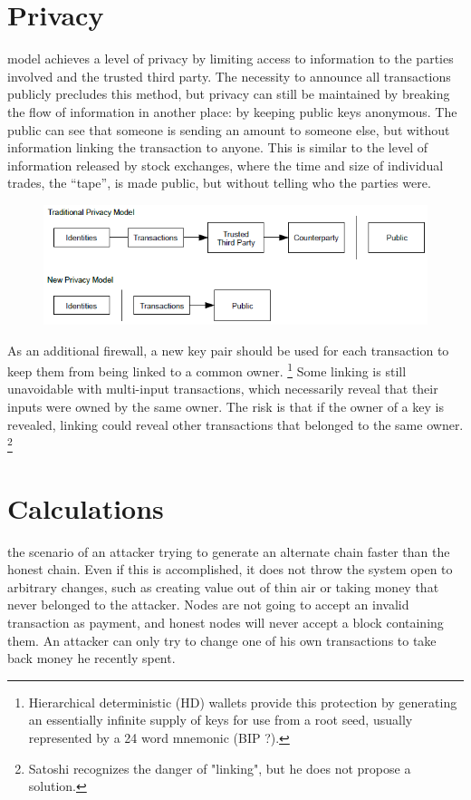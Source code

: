 \documentclass[nohyper]{tufte-handout}
\begin{document}
\section{Privacy}\label{privacy}

 model achieves a level of privacy by limiting access to information to the parties involved and the trusted third party. The necessity to announce all transactions publicly precludes this method, but privacy can still be maintained by breaking the flow of information in another place: by keeping public keys anonymous. The public can see that someone is sending an amount to someone else, but without information linking the transaction to anyone. This is similar to the level of information released by stock exchanges, where the time and size of individual trades, the ``tape'', is made public, but without telling who the parties were.

\begin{figure}[!h]
\centering
\includegraphics[width=0.75\linewidth]{privacy.png}
\end{figure}

As an additional firewall, a new key pair should be used for each
transaction to keep them from being linked to a common owner.  \footnote{Hierarchical deterministic (HD) wallets provide this protection by generating an essentially infinite supply of keys for use from a root seed, usually represented by a 24 word mnemonic (BIP ?).} Some
linking is still unavoidable with multi-input transactions, which
necessarily reveal that their inputs were owned by the same owner. The
risk is that if the owner of a key is revealed, linking could reveal
other transactions that belonged to the same owner.  \footnote{Satoshi recognizes the danger of "linking", but he does not propose a solution.}

\section{Calculations}\label{calculations}

 the scenario of an attacker trying to generate an alternate
chain faster than the honest chain. Even if this is accomplished, it
does not throw the system open to arbitrary changes, such as creating
value out of thin air or taking money that never belonged to the
attacker. Nodes are not going to accept an invalid transaction as
payment, and honest nodes will never accept a block containing them. An
attacker can only try to change one of his own transactions to take back
money he recently spent.
\end{document}
